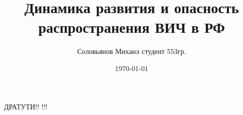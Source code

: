 \documentclass[a4paper,12pt]{book} %
\author{Соловьянов Михаил студент 553гр.}
\title{Динамика развития и опасность распространения ВИЧ в РФ}
\date{\today}
\begin{document}
\maketitle
\newpage

ДРАТУТИ!! !!!
\newpage
{}
\end{document}
